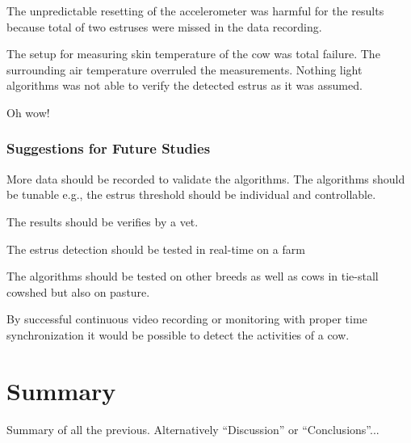 \documentclass[english,12pt,a4paper,pdftex,elec,utf8]{aaltothesis}
\begin{document}
The unpredictable resetting of the accelerometer was harmful for the results because total of two estruses were missed in the data recording.

The setup for measuring skin temperature of the cow was total failure. The surrounding air temperature overruled the measurements. Nothing light algorithms was not able to verify the detected estrus as it was assumed.

Oh wow!

\subsubsection{Suggestions for Future Studies}

More data should be recorded to validate the algorithms. The algorithms should be tunable e.g., the estrus threshold should be individual and controllable.

The results should be verifies by a vet.

The estrus detection should be tested in real-time on a farm

The algorithms should be tested on other breeds as well as cows in tie-stall cowshed but also on pasture.

By successful continuous video recording or monitoring with proper time synchronization it would be possible to detect the activities of a cow. 


\clearpage

\section{Summary} \label{summarysection}


Summary of all the previous. Alternatively ``Discussion'' or ``Conclusions''...


\clearpage

\thesisbibliography

%



\printbibliography




\clearpage

\thesisappendix


\end{document}
